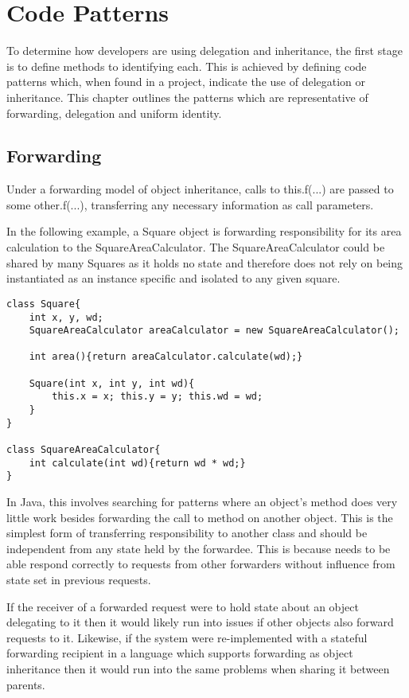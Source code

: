 \chapter{Code Patterns}\label{C:bg}
To determine how developers are using delegation and inheritance, the first stage is to define methods to identifying each. This is achieved by defining code patterns which, when found in a project, indicate the use of delegation or inheritance. This chapter outlines the patterns which are representative of forwarding, delegation and uniform identity.

\section{Forwarding}
Under a forwarding model of object inheritance, calls to this.f(...) are passed to some other.f(...), transferring any necessary information as call parameters.
\newline

In the following example, a Square object is forwarding responsibility for its area calculation to the SquareAreaCalculator. The SquareAreaCalculator could be shared by many Squares as it holds no state and therefore does not rely on being instantiated as an instance specific and isolated to any given square.

\begin{lstlisting}
class Square{
	int x, y, wd;
	SquareAreaCalculator areaCalculator = new SquareAreaCalculator();

	int area(){return areaCalculator.calculate(wd);}

	Square(int x, int y, int wd){
		this.x = x; this.y = y; this.wd = wd;
	}
}

class SquareAreaCalculator{
	int calculate(int wd){return wd * wd;}
}
\end{lstlisting}

In Java, this involves searching for patterns where an object's method does very little work besides forwarding the call to method on another object. This is the simplest form of transferring responsibility to another class and should be independent from any state held by the forwardee. This is because needs to be able respond correctly to requests from other forwarders without influence from state set in previous requests.

If the receiver of a forwarded request were to hold state about an object delegating to it then it would likely run into issues if other objects also forward requests to it. Likewise, if the system were re-implemented with a stateful forwarding recipient in a language which supports forwarding as object inheritance then it would run into the same problems when sharing it between parents.

